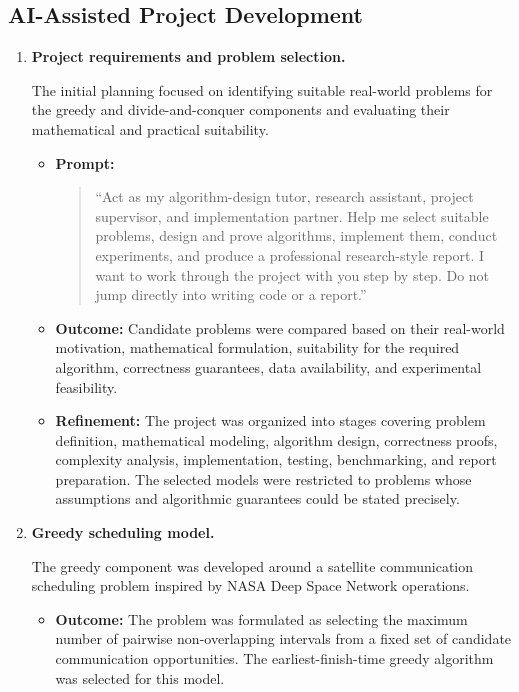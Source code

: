 \documentclass[conference]{IEEEtran}
\begin{document}
\subsection{AI-Assisted Project Development}

\begin{enumerate}

\item \textbf{Project requirements and problem selection.}

The initial planning focused on identifying suitable real-world problems
for the greedy and divide-and-conquer components and evaluating their
mathematical and practical suitability.

\begin{itemize}
    \item \textbf{Prompt:}
    \begin{quote}
    ``Act as my algorithm-design tutor, research assistant, project
    supervisor, and implementation partner. Help me select suitable
    problems, design and prove algorithms, implement them, conduct
    experiments, and produce a professional research-style report.
    I want to work through the project with you step by step. Do not
    jump directly into writing code or a report.''
    \end{quote}

    \item \textbf{Outcome:}
    Candidate problems were compared based on their real-world
    motivation, mathematical formulation, suitability for the required
    algorithm, correctness guarantees, data availability, and
    experimental feasibility.

    \item \textbf{Refinement:}
    The project was organized into stages covering problem definition,
    mathematical modeling, algorithm design, correctness proofs,
    complexity analysis, implementation, testing, benchmarking, and
    report preparation. The selected models were restricted to problems
    whose assumptions and algorithmic guarantees could be stated
    precisely.
\end{itemize}

\item \textbf{Greedy scheduling model.}

The greedy component was developed around a satellite communication
scheduling problem inspired by NASA Deep Space Network operations.

\begin{itemize}
    \item \textbf{Outcome:}
    The problem was formulated as selecting the maximum number of
    pairwise non-overlapping intervals from a fixed set of candidate
    communication opportunities. The earliest-finish-time greedy
    algorithm was selected for this model.


\end{itemize}
\end{enumerate}
\end{document}
